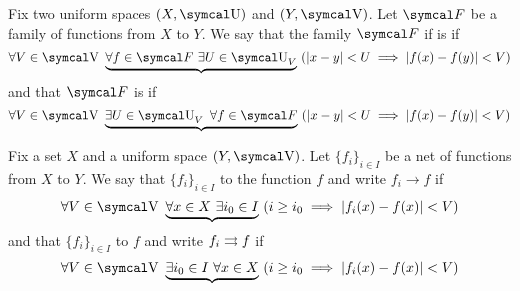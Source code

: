\begin{definition}\label{def:uniform_continuity}
  Fix two uniform spaces \( (X, \U) \) and \( (Y, \V) \). Let \( \Cal{F} \) be a family of functions from \( X \) to \( Y \). We say that the family \( \Cal{F} \) if is  if
  \begin{equation}\label{def:uniform_continuity/pointwise}
    \forall V \in \V \ \underbrace{\forall f \in \Cal{F} \ \exists U \in \U_V} \ (\Abs{x - y} < U \implies \Abs{f(x) - f(y)} < V)
  \end{equation}
  and that \( \Cal{F} \) is  if
  \begin{equation}\label{def:uniform_continuity/uniform}
    \forall V \in \V \ \underbrace{\exists U \in \U_V \ \forall f \in \Cal{F}} \ (\Abs{x - y} < U \implies \Abs{f(x) - f(y)} < V)
  \end{equation}
\end{definition}

\begin{definition}\label{def:uniform_convergence}
  Fix a set \( X \) and a uniform space \( (Y, \V) \). Let \( \{ f_i \}_{i \in I} \) be a net of functions from \( X \) to \( Y \). We say that \( \{ f_i \}_{i \in I} \)  to the function \( f \) and write \( f_i \to f \) if
  \begin{equation}\label{def:uniform_convergence/pointwise}
    \forall V \in \V \ \underbrace{\forall x \in X \ \exists i_0 \in I} \ (i \geq i_0 \implies \Abs{f_i(x) - f(x)} < V)
  \end{equation}
  and that \( \{ f_i \}_{i \in I} \)  to \( f \) and write \( f_i \rightrightarrows f \) if
  \begin{equation}\label{def:uniform_convergence/uniform}
    \forall V \in \V \ \underbrace{\exists i_0 \in I \ \forall x \in X} \ (i \geq i_0 \implies \Abs{f_i(x) - f(x)} < V)
  \end{equation}
\end{definition}
